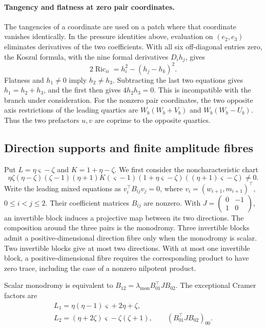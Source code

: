 \documentclass[11pt,a4paper]{article}
\numberwithin{equation}{section}
\theoremstyle{plain}
\theoremstyle{definition}
\theoremstyle{remark}
\begin{document}
\paragraph{Tangency and flatness at zero pair coordinates.}
\label{appr3fib:balanced}
The tangencies of a coordinate are used on a patch where that coordinate
vanishes identically. In the pressure identities above, evaluation on
$(e_2,e_3)$ eliminates derivatives of the two coefficients. With all
six off-diagonal entries zero, the Koszul formula, with the nine
formal derivatives $D_i h_j$, gives
\[
 2\operatorname{Ric}_{ii}=h_i^2-(h_j-h_k)^2.
\]
Flatness and $h_1\ne0$ imply $h_2\ne h_3$. Subtracting the last two
equations gives $h_1=h_2+h_3$, and the first then gives $4h_2h_3=0$.
This is incompatible with the branch under consideration. For the nonzero pair coordinates,
the two opposite axis restrictions of the leading quartics are
$W_b(W_b+V_b)$ and $W_b(W_b-U_b)$. Thus the two prefactors $u,v$
are coprime to the opposite quartics.

\subsection{Direction supports and finite amplitude fibres}
\label{appr3fib:support}

Put $L=\eta\varsigma-\zeta$ and $K=1+\eta-\zeta$.
We first consider the noncharacteristic chart
\[
 \eta \zeta (\eta -\zeta )(\zeta -1)(\eta +1)K(\varsigma -1)(1+\eta \varsigma -\zeta )((\eta +1)\varsigma -\zeta )\ne0.
\]
Write the leading mixed equations as
$v_i^{\top}B_{ij}v_j=0$, where $v_i=(w_{i+1},m_{i+1})^{\top}$,
$0\le i<j\le2$. Their coefficient matrices $B_{ij}$ are nonzero.
With $J=\left(\begin{smallmatrix}0&-1\\1&0\end{smallmatrix}\right)$,
an invertible block induces a projective map between its two directions.
The composition around the three pairs is the monodromy.
Three invertible blocks admit a positive-dimensional direction fibre
only when the monodromy is scalar. Two invertible blocks give at most
two directions. With at most one invertible block, a positive-dimensional
fibre requires the corresponding product to have zero trace, including
the case of a nonzero nilpotent product.

Scalar monodromy is equivalent to
$B_{12}=\lambda_{\mathrm{mon}} B_{01}^{\top}JB_{02}$.
The exceptional Cramer factors are
\[
 \begin{gathered}
 L_1=\eta (\eta -1)\varsigma +2\eta +\zeta ,\\
 L_2=(\eta +2\zeta )\varsigma -\zeta (\zeta +1),\qquad (B_{01}^{\top}JB_{02})_{00}.
 \end{gathered}
\]
\end{document}
